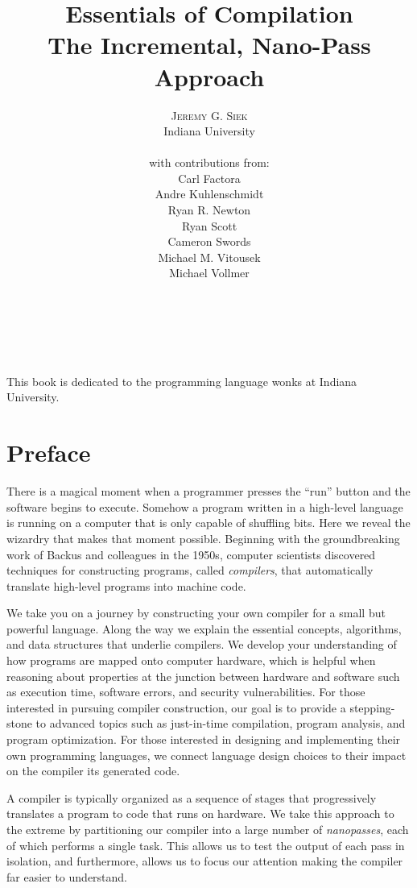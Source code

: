 \documentclass[11pt]{book}
\title{\Huge \textbf{Essentials of Compilation} \\
  \huge The Incremental, Nano-Pass Approach}
\author{\textsc{Jeremy G. Siek} \\
  Indiana University \\
  \\
  with contributions from: \\
  Carl Factora \\
  Andre Kuhlenschmidt \\
  Ryan R. Newton \\
  Ryan Scott \\
  Cameron Swords \\
  Michael M. Vitousek \\
  Michael Vollmer \\
  \\
  \ocaml{OCaml version:} \\
  \ocaml{Andrew Tolmach} \\
  \ocaml{(with inspiration from a Haskell version by Ian Winter)}
}
\newenvironment{dedication}
{
   \cleardoublepage
   \thispagestyle{empty}
   \vspace*{\stretch{1}}
   \hfill\begin{minipage}[t]{0.66\textwidth}
   \raggedright
}
{
   \end{minipage}
   \vspace*{\stretch{3}}
   \clearpage
}
\begin{document}
\frontmatter
\maketitle

\begin{dedication}
This book is dedicated to the programming language wonks at Indiana
University.
\end{dedication}

\tableofcontents
\listoffigures

\mainmatter

\chapter*{Preface}

There is a magical moment when a programmer presses the ``run'' button
and the software begins to execute. Somehow a program written in a
high-level language is running on a computer that is only capable of
shuffling bits. Here we reveal the wizardry that makes that moment
possible. Beginning with the groundbreaking work of Backus and
colleagues in the 1950s, computer scientists discovered techniques for
constructing programs, called \emph{compilers}, that automatically
translate high-level programs into machine code.

We take you on a journey by constructing your own compiler for a small
but powerful language. Along the way we explain the essential
concepts, algorithms, and data structures that underlie compilers. We
develop your understanding of how programs are mapped onto computer
hardware, which is helpful when reasoning about properties at the
junction between hardware and software such as execution time,
software errors, and security vulnerabilities.  For those interested
in pursuing compiler construction, our goal is to provide a
stepping-stone to advanced topics such as just-in-time compilation,
program analysis, and program optimization.  For those interested in
designing and implementing their own programming languages, we connect
language design choices to their impact on the compiler its generated
code.

A compiler is typically organized as a sequence of stages that
progressively translates a program to code that runs on hardware. We
take this approach to the extreme by partitioning our compiler into a
large number of \emph{nanopasses}, each of which performs a single
task. This allows us to test the output of each pass in isolation, and
furthermore, allows us to focus our attention making the compiler far
easier to understand.
\end{document}
